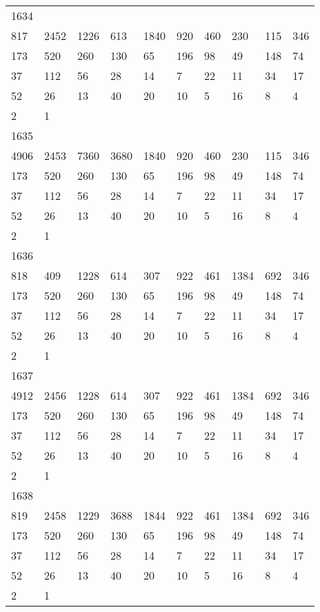 \begin{longtable}{*{10}{l}}
1634&&&&&&&&&\\
817& 2452& 1226& 613& 1840& 920& 460& 230& 115& 346\\
173& 520& 260& 130& 65& 196& 98& 49& 148& 74\\
37& 112& 56& 28& 14& 7& 22& 11& 34& 17\\
52& 26& 13& 40& 20& 10& 5& 16& 8& 4\\
2& 1& \\

1635&&&&&&&&&\\
4906& 2453& 7360& 3680& 1840& 920& 460& 230& 115& 346\\
173& 520& 260& 130& 65& 196& 98& 49& 148& 74\\
37& 112& 56& 28& 14& 7& 22& 11& 34& 17\\
52& 26& 13& 40& 20& 10& 5& 16& 8& 4\\
2& 1& \\

1636&&&&&&&&&\\
818& 409& 1228& 614& 307& 922& 461& 1384& 692& 346\\
173& 520& 260& 130& 65& 196& 98& 49& 148& 74\\
37& 112& 56& 28& 14& 7& 22& 11& 34& 17\\
52& 26& 13& 40& 20& 10& 5& 16& 8& 4\\
2& 1& \\

1637&&&&&&&&&\\
4912& 2456& 1228& 614& 307& 922& 461& 1384& 692& 346\\
173& 520& 260& 130& 65& 196& 98& 49& 148& 74\\
37& 112& 56& 28& 14& 7& 22& 11& 34& 17\\
52& 26& 13& 40& 20& 10& 5& 16& 8& 4\\
2& 1& \\

1638&&&&&&&&&\\
819& 2458& 1229& 3688& 1844& 922& 461& 1384& 692& 346\\
173& 520& 260& 130& 65& 196& 98& 49& 148& 74\\
37& 112& 56& 28& 14& 7& 22& 11& 34& 17\\
52& 26& 13& 40& 20& 10& 5& 16& 8& 4\\
2& 1& \\


\end{longtable}
